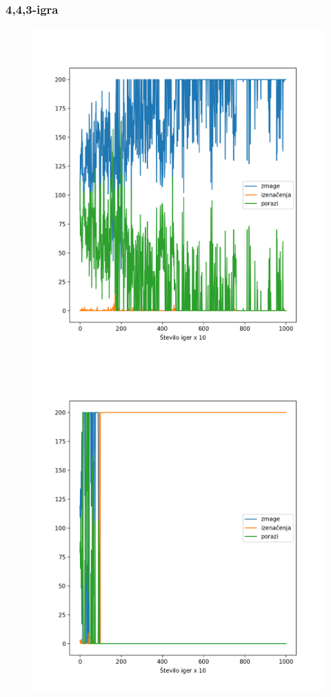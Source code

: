 \documentclass{beamer}    %
\begin{document}
\begin{frame}
    \frametitle{4,4,3-igra}
    \begin{figure}
        \includegraphics[scale=0.29]{slike/443-agent.png}
        \includegraphics[scale=0.29]{slike/443g-agent.png}
    \end{figure}
\end{frame}
\end{document}
